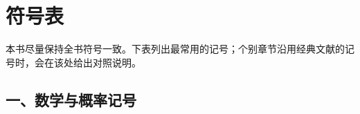\chapter*{符号表}
\thispagestyle{frontstyle}

本书尽量保持全书符号一致。下表列出最常用的记号；个别章节沿用经典文献的记号时，会在该处给出对照说明。

\section*{一、数学与概率记号}

\vspace{0.3em}
